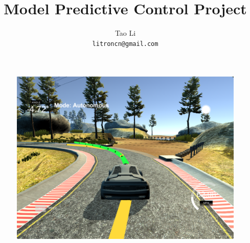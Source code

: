 \documentclass[10pt,onecolumn,letterpaper]{article}
\title{Model Predictive Control Project}
\author{Tao Li\\
{\tt\small litroncn@gmail.com}
}
\begin{document}
\maketitle


\begin{figure}[!ht]
\centering
    \includegraphics[width=0.9\linewidth]{preface.png}
\end{figure}













{\small


}
\end{document}
